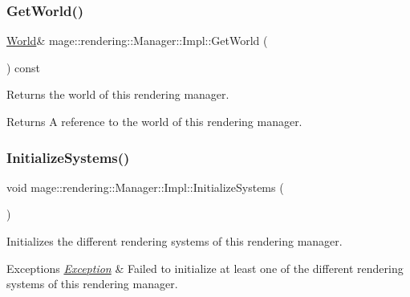 \subsubsection{\texorpdfstring{Get\+World()}{GetWorld()}}
{\footnotesize\ttfamily \hyperlink{classmage_1_1rendering_1_1_world}{World}\& mage\+::rendering\+::\+Manager\+::\+Impl\+::\+Get\+World (\begin{DoxyParamCaption}{ }\end{DoxyParamCaption}) const\hspace{0.3cm}{\ttfamily [noexcept]}}

Returns the world of this rendering manager.

\begin{DoxyReturn}{Returns}
A reference to the world of this rendering manager. 
\end{DoxyReturn}
\hypertarget{classmage_1_1rendering_1_1_manager_1_1_impl_abb9706b54c07c3493ef906667051c336}{}\label{classmage_1_1rendering_1_1_manager_1_1_impl_abb9706b54c07c3493ef906667051c336} 
\subsubsection{\texorpdfstring{Initialize\+Systems()}{InitializeSystems()}}
{\footnotesize\ttfamily void mage\+::rendering\+::\+Manager\+::\+Impl\+::\+Initialize\+Systems (\begin{DoxyParamCaption}{ }\end{DoxyParamCaption})\hspace{0.3cm}{\ttfamily [private]}}

Initializes the different rendering systems of this rendering manager.


\begin{DoxyExceptions}{Exceptions}
{\em \hyperlink{classmage_1_1_exception}{Exception}} & Failed to initialize at least one of the different rendering systems of this rendering manager. \\
\hline
\end{DoxyExceptions}
\hypertarget{classmage_1_1rendering_1_1_manager_1_1_impl_a2367cc9262863faeed5166bd53ba52c0}{}\label{classmage_1_1rendering_1_1_manager_1_1_impl_a2367cc9262863faeed5166bd53ba52c0} 
